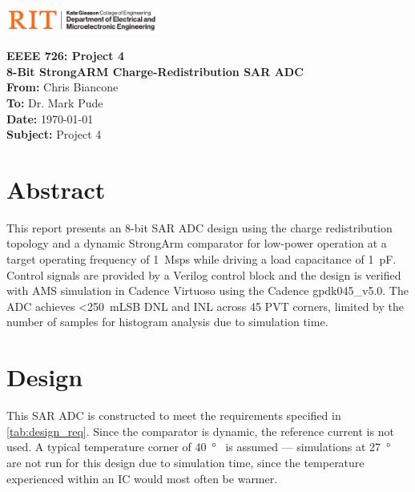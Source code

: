 \documentclass[11pt,letterpaper]{article}
\begin{document}
\VerbatimFootnotes %


	\hspace{4.5in}
	\includegraphics[width=2in,trim=0cm 0in 0in 0.0in,clip]{images/COE_EME_1505C_hor_k1.pdf}
\newline

\Huge\textbf{EEEE 726: Project 4 \\8-Bit StrongARM Charge-Redistribution SAR ADC}\\

\Large
\textbf{From:} Chris Biancone \\
\textbf{To: } Dr. Mark Pude \\
\textbf{Date: } \today \\
\textbf{Subject: } Project 4\\
\vspace{0.5in}

\section*{Abstract}
\normalsize
This report presents an 8-bit SAR ADC design using the charge redistribution topology and a dynamic StrongArm comparator for low-power operation at a target operating frequency of \qty{1}{Msps} while driving a load capacitance of \qty{1}{\pF}. Control signals are provided by a Verilog control block and the design is verified with AMS simulation in Cadence Virtuoso using the Cadence gpdk045\_v5.0. The ADC achieves <\qty{250}{mLSB} DNL and INL across 45 PVT corners, limited by the number of samples for histogram analysis due to simulation time. 

\section{Design}

This SAR ADC is constructed to meet the requirements specified in \cref{tab:design_req}. Since the comparator is dynamic, the reference current is not used. A typical temperature corner of \qty{40}{\degree\C} is assumed --- simulations at \qty{27}{\degree\C} are not run for this design due to simulation time, since the temperature experienced within an IC would most often be warmer.
\end{document}
